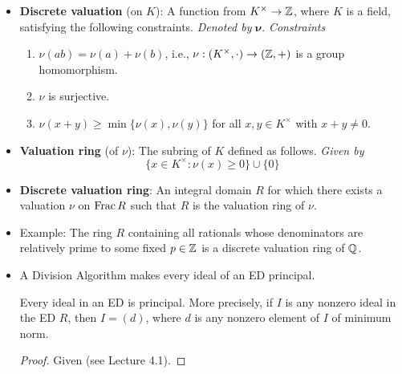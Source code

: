\documentclass[../notes.tex]{subfiles}
\begin{document}
\begin{itemize}
\begin{enumerate}
\begin{itemize}
            \item Gaussian integers do work, though, under this absolute value field norm.
            \item The rest of the proof that $\Z[i]$ is an ED goes beyond the scope of class.
        \end{itemize}
        \item \textbf{Discrete valuation rings}.
        \begin{itemize}
            \item Take $N=\nu$ and $N(0)=0$.
        \end{itemize}
    \end{enumerate}
    \item \textbf{Discrete valuation} (on $K$): A function from $K^\times\to\mathbb{Z}$, where $K$ is a field, satisfying the following constraints. \emph{Denoted by} $\bm{\nu}$. \emph{Constraints}
    \begin{enumerate}[label={(\roman*)}]
        \item $\nu(ab)=\nu(a)+\nu(b)$, i.e., $\nu:(K^\times,\cdot)\to(\mathbb{Z},+)$ is a group homomorphism.
        \item $\nu$ is surjective.
        \item $\nu(x+y)\geq\min\{\nu(x),\nu(y)\}$ for all $x,y\in K^\times$ with $x+y\neq 0$.
    \end{enumerate}
    \item \textbf{Valuation ring} (of $\nu$): The subring of $K$ defined as follows. \emph{Given by}
    \begin{equation*}
        \{x\in K^\times:\nu(x)\geq 0\}\cup\{0\}
    \end{equation*}
    \item \textbf{Discrete valuation ring}: An integral domain $R$ for which there exists a valuation $\nu$ on $\operatorname{Frac} R$ such that $R$ is the valuation ring of $\nu$.
    \item Example: The ring $R$ containing all rationals whose denominators are relatively prime to some fixed $p\in\mathbb{Z}$ is a discrete valuation ring of $\mathbb{Q}$.
    \item A Division Algorithm makes every ideal of an ED principal.
    \begin{proposition}\label{prp:8.1}
        Every ideal in an ED is principal. More precisely, if $I$ is any nonzero ideal in the ED $R$, then $I=(d)$, where $d$ is any nonzero element of $I$ of minimum norm.
        \begin{proof}
            Given (see Lecture 4.1).
        \end{proof}

\end{proposition}
\end{itemize}
\end{document}
